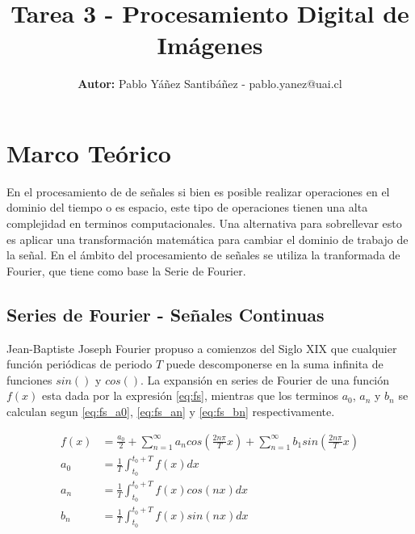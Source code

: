 \documentclass[
  letterpaper,
  twocolumn,
  9pt,
  journal,
  final]{IEEEtran}
\title{Tarea 3 - Procesamiento Digital de Imágenes}
\author{\textbf{Autor:} Pablo Yáñez Santibáñez - pablo.yanez@uai.cl}
\begin{document}
\maketitle


\tableofcontents



\section{Marco Teórico}

En el procesamiento de de señales si bien es posible realizar operaciones en el dominio del tiempo o es espacio, este tipo de operaciones tienen una alta complejidad en terminos computacionales. Una alternativa para sobrellevar esto es aplicar una transformación matemática para cambiar el dominio de trabajo de la señal. En el ámbito del procesamiento de señales se utiliza la tranformada de Fourier, que tiene como base la Serie de Fourier.

\subsection{Series de Fourier - Señales Continuas}

Jean-Baptiste Joseph Fourier propuso a comienzos del Siglo XIX que cualquier función periódicas de periodo $T$ puede descomponerse en la suma infinita de funciones $sin()$ y $cos()$. La expansión en series de Fourier de una función $f(x)$ esta dada por la expresión \ref{eq:fs}, mientras que los terminos $a_0$, $a_n$ y $b_n$ se calculan segun \ref{eq:fs_a0}, \ref{eq:fs_an} y \ref{eq:fs_bn} respectivamente.




\begin{align}
	f(x) &= \frac{a_0}{2} + \sum_{n=1}^{\infty} a_n cos \left(\frac{2n\pi}{T}x\right) + \sum_{n=1}^{\infty} b_1 sin\left(\frac{2n\pi}{T}x\right) \label{eq:fs} \\
	a_0 &= \frac{1}{T} \int_{t_0}^{t_0 + T} f(x) dx \label{eq:fs_a0} \\
	a_n &= \frac{1}{T} \int_{t_0}^{t_0 + T} f(x) cos(nx) dx \label{eq:fs_an}\\
	b_n &= \frac{1}{T} \int_{t_0}^{t_0 + T} f(x) sin(nx) dx \label{eq:fs_bn}
\end{align}
\end{document}

